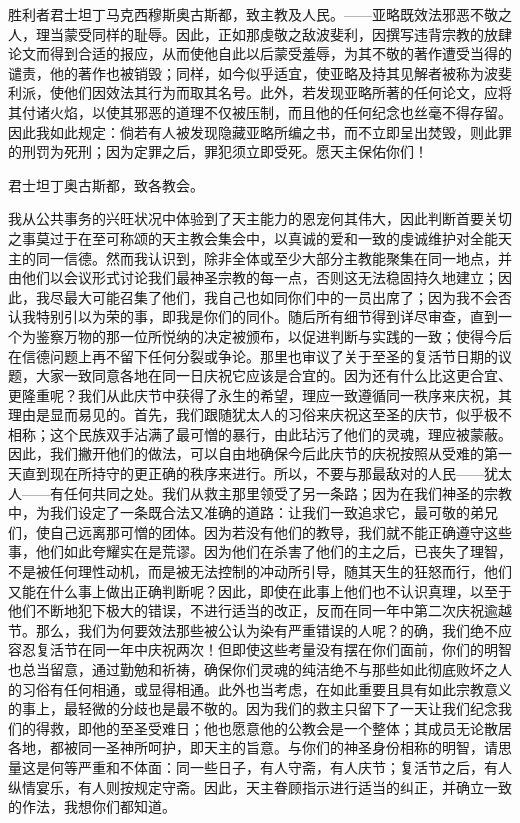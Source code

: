 \par

胜利者君士坦丁马克西穆斯奥古斯都，致主教及人民。——亚略既效法邪恶不敬之人，理当蒙受同样的耻辱。因此，正如那虔敬之敌波斐利，因撰写违背宗教的放肆论文而得到合适的报应，从而使他自此以后蒙受羞辱，为其不敬的著作遭受当得的谴责，他的著作也被销毁；同样，如今似乎适宜，使亚略及持其见解者被称为波斐利派，使他们因效法其行为而取其名号。此外，若发现亚略所著的任何论文，应将其付诸火焰，以使其邪恶的道理不仅被压制，而且他的任何纪念也丝毫不得存留。因此我如此规定：倘若有人被发现隐藏亚略所编之书，而不立即呈出焚毁，则此罪的刑罚为死刑；因为定罪之后，罪犯须立即受死。愿天主保佑你们！\par

\par

君士坦丁奥古斯都，致各教会。\par

我从公共事务的兴旺状况中体验到了天主能力的恩宠何其伟大，因此判断首要关切之事莫过于在至可称颂的天主教会集会中，以真诚的爱和一致的虔诚维护对全能天主的同一信德。然而我认识到，除非全体或至少大部分主教能聚集在同一地点，并由他们以会议形式讨论我们最神圣宗教的每一点，否则这无法稳固持久地建立；因此，我尽最大可能召集了他们，我自己也如同你们中的一员出席了；因为我不会否认我特别引以为荣的事，即我是你们的同仆。随后所有细节得到详尽审查，直到一个为鉴察万物的那一位所悦纳的决定被颁布，以促进判断与实践的一致；使得今后在信德问题上再不留下任何分裂或争论。那里也审议了关于至圣的复活节日期的议题，大家一致同意各地在同一日庆祝它应该是合宜的。因为还有什么比这更合宜、更隆重呢？我们从此庆节中获得了永生的希望，理应一致遵循同一秩序来庆祝，其理由是显而易见的。首先，我们跟随犹太人的习俗来庆祝这至圣的庆节，似乎极不相称；这个民族双手沾满了最可憎的暴行，由此玷污了他们的灵魂，理应被蒙蔽。因此，我们撇开他们的做法，可以自由地确保今后此庆节的庆祝按照从受难的第一天直到现在所持守的更正确的秩序来进行。所以，不要与那最敌对的人民——犹太人——有任何共同之处。我们从救主那里领受了另一条路；因为在我们神圣的宗教中，为我们设定了一条既合法又准确的道路：让我们一致追求它，最可敬的弟兄们，使自己远离那可憎的团体。因为若没有他们的教导，我们就不能正确遵守这些事，他们如此夸耀实在是荒谬。因为他们在杀害了他们的主之后，已丧失了理智，不是被任何理性动机，而是被无法控制的冲动所引导，随其天生的狂怒而行，他们又能在什么事上做出正确判断呢？因此，即使在此事上他们也不认识真理，以至于他们不断地犯下极大的错误，不进行适当的改正，反而在同一年中第二次庆祝逾越节。那么，我们为何要效法那些被公认为染有严重错误的人呢？的确，我们绝不应容忍复活节在同一年中庆祝两次！但即使这些考量没有摆在你们面前，你们的明智也总当留意，通过勤勉和祈祷，确保你们灵魂的纯洁绝不与那些如此彻底败坏之人的习俗有任何相通，或显得相通。此外也当考虑，在如此重要且具有如此宗教意义的事上，最轻微的分歧也是最不敬的。因为我们的救主只留下了一天让我们纪念我们的得救，即他的至圣受难日；他也愿意他的公教会是一个整体；其成员无论散居各地，都被同一圣神所呵护，即天主的旨意。与你们的神圣身份相称的明智，请思量这是何等严重和不体面：同一些日子，有人守斋，有人庆节；复活节之后，有人纵情宴乐，有人则按规定守斋。因此，天主眷顾指示进行适当的纠正，并确立一致的作法，我想你们都知道。\par

